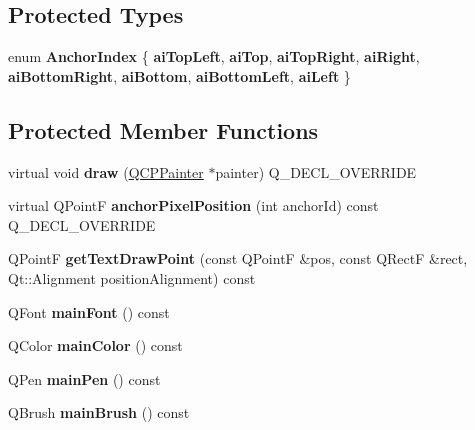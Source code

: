 \subsection*{Protected Types}
\begin{DoxyCompactItemize}
\item 
\mbox{\label{classQCPItemText_a14a84e58f72519c8ae1d7a4a1dd23f21}} 
enum {\bfseries Anchor\+Index} \{ \newline
{\bfseries ai\+Top\+Left}, 
{\bfseries ai\+Top}, 
{\bfseries ai\+Top\+Right}, 
{\bfseries ai\+Right}, 
\newline
{\bfseries ai\+Bottom\+Right}, 
{\bfseries ai\+Bottom}, 
{\bfseries ai\+Bottom\+Left}, 
{\bfseries ai\+Left}
 \}
\end{DoxyCompactItemize}
\subsection*{Protected Member Functions}
\begin{DoxyCompactItemize}
\item 
\mbox{\label{classQCPItemText_a8f8f075da83b6547c2b32e1f64cf0554}} 
virtual void {\bfseries draw} (\hyperlink{classQCPPainter}{Q\+C\+P\+Painter} $\ast$painter) Q\+\_\+\+D\+E\+C\+L\+\_\+\+O\+V\+E\+R\+R\+I\+DE
\item 
\mbox{\label{classQCPItemText_afcdb1724d88d561f65da95fb54b0acb7}} 
virtual Q\+PointF {\bfseries anchor\+Pixel\+Position} (int anchor\+Id) const Q\+\_\+\+D\+E\+C\+L\+\_\+\+O\+V\+E\+R\+R\+I\+DE
\item 
\mbox{\label{classQCPItemText_a4c76ad7e33c50aff0a60b8f38fe6060e}} 
Q\+PointF {\bfseries get\+Text\+Draw\+Point} (const Q\+PointF \&pos, const Q\+RectF \&rect, Qt\+::\+Alignment position\+Alignment) const
\item 
\mbox{\label{classQCPItemText_af30ac2a0b84afa86a1dec22ab48dd07d}} 
Q\+Font {\bfseries main\+Font} () const
\item 
\mbox{\label{classQCPItemText_abe3f10805baf62797cb91fd4a4464fcc}} 
Q\+Color {\bfseries main\+Color} () const
\item 
\mbox{\label{classQCPItemText_a2f67fcbb7ac10ea9a94c4ecc3b0f4dfc}} 
Q\+Pen {\bfseries main\+Pen} () const
\item 
\mbox{\label{classQCPItemText_acddddd3ce88cfc87ab57b1ec4b25acb9}} 
Q\+Brush {\bfseries main\+Brush} () const
\end{DoxyCompactItemize}
